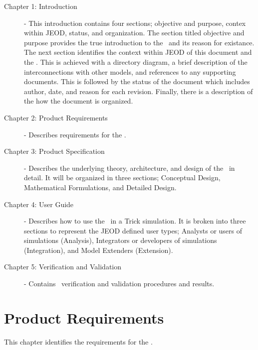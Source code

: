 \begin{description}

\item[Chapter 1: Introduction] -
This introduction contains four sections; objective and purpose, contex within JEOD, status, and organization.
The section titled objective and purpose provides the true introduction to the \earthlightingDesc\ and its reason
for existance.  The next section identifies the context within JEOD of this document and the \earthlightingDesc.
This is achieved with a directory diagram, a brief description of the interconnections with other models, and
references to any supporting documents.  This is followed by the status of the document which includes
author, date, and reason for each revision.  Finally, there is a description of the how the document is organized.

\item[Chapter 2: Product Requirements] -
Describes requirements for the \earthlightingDesc.

\item[Chapter 3: Product Specification] -
Describes the underlying theory, architecture, and design of the \earthlightingDesc\ in detail.  It will be organized in
three sections; Conceptual Design, Mathematical Formulations, and Detailed Design.

\item[Chapter 4: User Guide] -
Describes how to use the \earthlightingDesc\ in a Trick simulation.  It is broken into three sections to represent the JEOD
defined user types; Analysts or users of simulations (Analysis), Integrators or developers of simulations (Integration),
and Model Extenders (Extension).

\item[Chapter 5: Verification and Validation] -
Contains \earthlightingDesc\ verification and validation procedures and results.

\end{description}

\chapter{Product Requirements}\label{ch:reqt}

This chapter identifies the requirements for the \earthlightingDesc.

